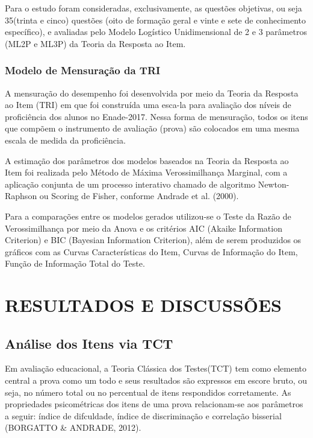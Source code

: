 \documentclass[12pt]{article}
\begin{document}
Para o estudo foram consideradas, exclusivamente, as questões objetivas, ou seja 35(trinta e cinco) questões (oito de formação geral e vinte e sete de conhecimento específico), e avaliadas pelo Modelo Logístico Unidimensional de 2 e 3 parâmetros (ML2P e ML3P) da Teoria da Resposta ao Item.


\subsubsection{Modelo de Mensuração da TRI}

A mensuração do desempenho foi desenvolvida por meio da Teoria da Resposta ao Item (TRI) em que foi construída uma esca-la para avaliação dos níveis de proficiência dos alunos no Enade-2017. Nessa forma de mensuração, todos os itens que compõem o instrumento de avaliação (prova) são colocados em uma mesma escala de medida da proficiência.

A estimação dos parâmetros dos modelos baseados na Teoria da Resposta ao Item foi realizada pelo Método de Máxima Verossimilhança Marginal, com a aplicação conjunta de um processo interativo chamado de algoritmo Newton-Raphson ou Scoring de Fisher, conforme Andrade et al. (2000).\vskip0.3cm

Para a comparações entre os modelos gerados utilizou-se o Teste da Razão de Verossimilhança por meio da Anova e os critérios AIC (Akaike Information Criterion) e BIC (Bayesian Information Criterion), além de serem produzidos os gráficos com as Curvas Características do Item, Curvas de Informação do Item, Função de Informação Total do Teste.\vskip0.3cm







\section{RESULTADOS E DISCUSSÕES}
\subsection{Análise dos Itens via TCT}

Em avaliação educacional, a Teoria Clássica dos Testes(TCT) tem como elemento central a prova como um todo e seus resultados são expressos em escore bruto, ou seja, no número total ou no percentual de itens respondidos corretamente. As propriedades psicométricas dos itens de uma prova relacionam-se aos parâmetros a seguir: índice de difculdade, índice de discriminação e correlação bisserial (BORGATTO \& ANDRADE, 2012).
\end{document}
